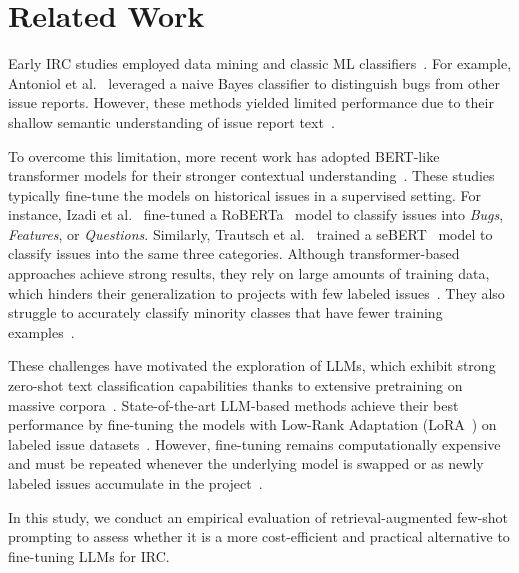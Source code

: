 
\section{Related Work}
\label{sec:02_related}

Early IRC studies employed data mining and classic ML classifiers~\cite{antoniol2008bug, kallis2019ticket, fan2017road}. For example, Antoniol et al.~\cite{antoniol2008bug} leveraged a naive Bayes classifier to distinguish bugs from other issue reports. However, these methods yielded limited performance due to their shallow semantic understanding of issue report text~\cite{heo2025study}.

To overcome this limitation, more recent work has adopted BERT-like transformer models for their stronger contextual understanding~\cite{colavito2022issue, bharadwaj2022github, trautsch2022predicting, izadi2022catiss, izadi2022predicting}. These studies typically fine-tune the models on historical issues in a supervised setting. For instance, Izadi et al.~\cite{izadi2022catiss} fine-tuned a RoBERTa~\cite{liu2019roberta} model to classify issues into \textit{Bugs}, \textit{Features}, or \textit{Questions}. Similarly, Trautsch et al.~\cite{trautsch2022predicting} trained a seBERT~\cite{von2022validity} model to classify issues into the same three categories. Although transformer-based approaches achieve strong results, they rely on large amounts of training data, which hinders their generalization to projects with few labeled issues~\cite{heo2025study, izadi2022catiss}. They also struggle to accurately classify minority classes that have fewer training examples~\cite{izadi2022predicting, colavito2022issue}.

These challenges have motivated the exploration of LLMs, which exhibit strong zero-shot text classification capabilities thanks to extensive pretraining on massive corpora~\cite{heo2025study, aracena2025applying, aracena2024applyinglargelanguagemodels, brown2020language, wei2021finetuned, colavito2024leveraging}. State-of-the-art LLM-based methods achieve their best performance by fine-tuning the models with Low-Rank Adaptation (LoRA~\cite{hu2022lora}) on labeled issue datasets~\cite{heo2025study, aracena2025applying, aracena2024applyinglargelanguagemodels}. However, fine-tuning remains computationally expensive and must be repeated whenever the underlying model is swapped or as newly labeled issues accumulate in the project~\cite{fan2017road, kallis2019ticket}.

In this study, we conduct an empirical evaluation of retrieval-augmented few-shot prompting to assess whether it is a more cost-efficient and practical alternative to fine-tuning LLMs for IRC.


